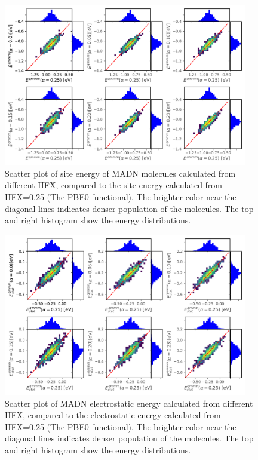 \documentclass[letterpaper,12pt]{article}
\begin{document}
\begin{figure}[H]
    \centering
    \includegraphics[width=0.95\textwidth]{figs/MADN_HFX/scatterE_qmmm.pdf}
    \caption{Scatter plot of site energy of MADN molecules calculated from different HFX, compared to the site energy calculated from HFX=0.25 (The PBE0 functional). The brighter color near the diagonal lines indicates denser population of the molecules.  The top and right histogram show the energy distributions.}
    \label{fig:E_qmmm_MADN}
\end{figure}

\begin{figure}[H]
    \centering
    \includegraphics[width=0.95\textwidth]{figs/MADN_HFX/scatterEstat_qmmm.pdf}
    \caption{Scatter plot of MADN electrostatic energy calculated from different HFX, compared to the electrostatic energy calculated from HFX=0.25 (The PBE0 functional). The brighter color near the diagonal lines indicates denser population of the molecules.  The top and right histogram show the energy distributions.}
    \label{fig:Estat_qmmm_MADN}
\end{figure}
\end{document}
